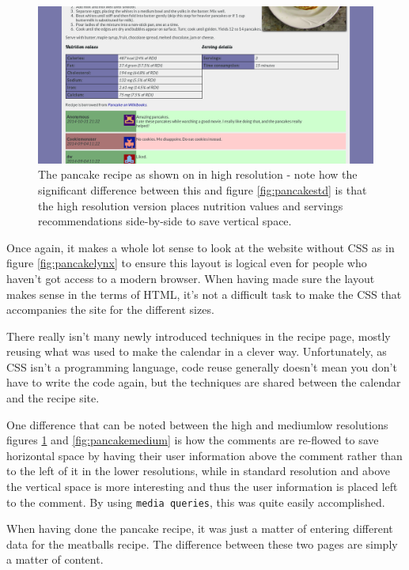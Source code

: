 \documentclass[a4paper]{scrartcl}
\begin{document}
\begin{figure}[!h]
  \begin{center}
    \includegraphics[scale=0.3]{pancakehigh1.png}
    \caption{The pancake recipe as shown on in high resolution - note how the significant difference between this and figure \ref{fig:pancakestd} is that the high resolution version places nutrition values and servings recommendations side-by-side to save vertical space.}
    \label{fig:pancakehigh}
  \end{center}
\end{figure}

Once again, it makes a whole lot sense to look at the website without CSS as in figure \ref{fig:pancakelynx} to ensure this layout is logical even for people who haven't got access to a modern browser. When having made sure the layout makes sense in the terms of HTML, it's not a difficult task to make the CSS that accompanies the site for the different sizes.

There really isn't many newly introduced techniques in the recipe page, mostly reusing what was used to make the calendar in a clever way. Unfortunately, as CSS isn't a programming language, code reuse generally doesn't mean you don't have to write the code again, but the techniques are shared between the calendar and the recipe site.

One difference that can be noted between the high and mediumlow resolutions figures \ref{fig:pancakehigh} and \ref{fig:pancakemedium} is how the comments are re-flowed to save horizontal space by having their user information above the comment rather than to the left of it in the lower resolutions, while in standard resolution and above the vertical space is more interesting and thus the user information is placed left to the comment. By using \texttt{media queries}, this was quite easily accomplished.

When having done the pancake recipe, it was just a matter of entering different data for the meatballs recipe. The difference between these two pages are simply a matter of content.
\end{document}
